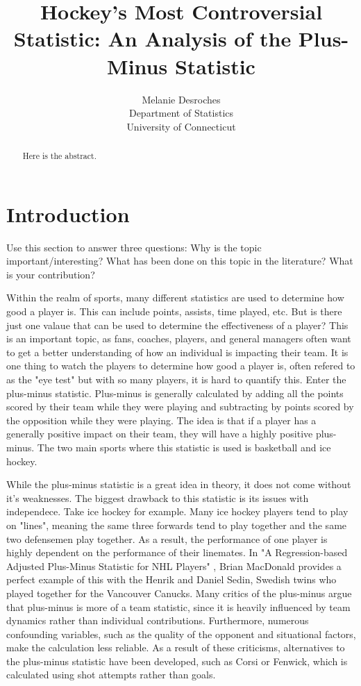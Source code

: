 \documentclass[12pt]{article}
\title{Hockey's Most Controversial Statistic: An Analysis of the Plus-Minus Statistic}
\author{Melanie Desroches\\
  Department of Statistics\\
  University of Connecticut
}
\begin{document}
\maketitle

\begin{abstract}
Here is the abstract.  
\end{abstract}

\doublespacing

\section{Introduction}
\label{sec:intro}

Use this section to answer three questions:
Why is the topic important/interesting?
What has been done on this topic in the literature?
What is your contribution?

Within the realm of sports, many different statistics are used to determine how good a player is. This can include points,
assists, time played, etc. But is there just one valaue that can be used to determine the effectiveness of a player? This is an 
important topic, as fans, coaches, players, and general managers often want to get a better understanding of how an individual is
impacting their team. It is one thing to watch the players to determine how good a player is, often refered to as the "eye test" but 
with so many players, it is hard to quantify this. Enter the plus-minus statistic. Plus-minus is generally calculated by adding all the points
scored by their team while they were playing and subtracting by points scored by the opposition while they were playing. The idea is that 
if a player has a generally positive impact on their team, they will have a highly positive plus-minus. The two main sports where this
statistic is used is basketball and ice hockey. 

While the plus-minus statistic is a great idea in theory, it does not come without it's weaknesses. The biggest drawback to this
statistic is its issues with independece. Take ice hockey for example. Many ice hockey players tend to play on "lines", meaning the same three 
forwards tend to play together and the same two defensemen play together. As a result, the performance of one player is highly dependent 
on the performance of their linemates. In "A Regression-based Adjusted Plus-Minus Statistic for NHL Players" \cite{Macdonald_2011}, Brian
MacDonald provides a perfect example of this with the Henrik and Daniel Sedin, Swedish twins who played together for the Vancouver Canucks.
Many critics of the plus-minus argue that plus-minus is more of a team statistic, since it is heavily influenced by team dynamics rather than
individual contributions. Furthermore, numerous confounding variables, such as the quality of the opponent and situational factors, make the 
calculation less reliable. As a result of these criticisms, alternatives to the plus-minus statistic have been developed, such as Corsi or 
Fenwick, which is calculated using shot attempts rather than goals.
\end{document}
